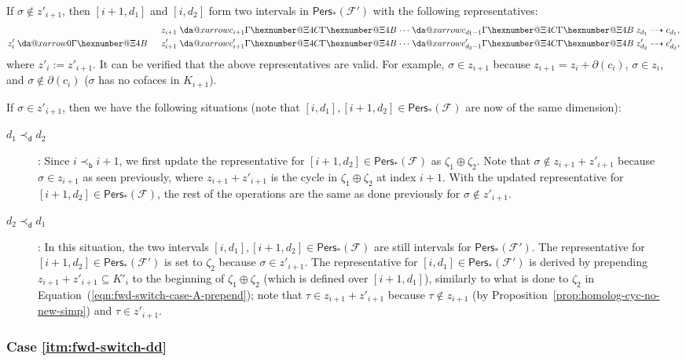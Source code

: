 \documentclass[letterpaper,11pt]{article}
\makeatletter
\theoremstyle{mythmstyle}
\theoremstyle{mydefstyle}
\theoremstyle{plain}
\theoremstyle{definition}
\newcommand{\Pers}{\mathsf{Pers}}
\newcommand{\<}[1]{\langle #1\rangle}
\newcommand{\Fcal}{\mathcal{F}}
\newcommand{\sG}{\sigma}
\newcommand{\tG}{\tau}
\newcommand{\bles}{\prec_{\mathsf{b}}}
\newcommand{\dles}{\prec_{\mathsf{d}}}
\newcommand{\repsum}{\oplus}
\newcommand{\cyc}{z}
\newcommand{\chn}{c}
\newcommand{\rseq}{\zeta}
\newcommand*{\da@rightarrow}{\mathchar"0\hexnumber@\symAMSa 4B }
\newcommand*{\da@leftarrow}{\mathchar"0\hexnumber@\symAMSa 4C }
\newcommand*{\xdashrightarrow}[2][]{%
  \mathrel{%
    \mathpalette{\da@xarrow{#1}{#2}{}\da@rightarrow{\;}{}}{}%
  }%
}
\newcommand{\xdashleftrightarrow}[2][]{%
  \mathrel{%
    \mathpalette{\da@xarrow{#1}{#2}\da@leftarrow\da@rightarrow{}{}}{}%
  }%
}
\newcommand*{\da@xarrow}[7]{%
  \sbox0{$\ifx#7\scriptstyle\scriptscriptstyle\else\scriptstyle\fi#5#1#6\m@th$}%
  \sbox2{$\ifx#7\scriptstyle\scriptscriptstyle\else\scriptstyle\fi#5#2#6\m@th$}%
  \sbox4{$#7\dabar@\m@th$}%
  \dimen@=\wd0 %
  \ifdim\wd2 >\dimen@
    \dimen@=\wd2 %
  \fi
  \count@=2 %
  \def\da@bars{\dabar@\dabar@}%
  \@whiledim\count@\wd4<\dimen@\do{%
    \advance\count@\@ne
    \expandafter\def\expandafter\da@bars\expandafter{%
      \da@bars
      \dabar@ 
    }%
  }%
  \mathrel{#3}%
  \mathrel{%
    \mathop{\da@bars}\limits
    \ifx\\#1\\%
    \else
      _{\copy0}%
    \fi
    \ifx\\#2\\%
    \else
      ^{\copy2}%
    \fi
  }%
  \mathrel{#4}%
  \!\!
}
\let\rseqlrarr\xdashleftrightarrow
\let\rseqrarr\xdashrightarrow
\makeatother
\begin{document}
If $\sG\not\in\cyc'_{i+1}$, 
then $[i+1,d_1]$ and $[i,d_2]$ form two intervals in $\Pers_*(\Fcal')$
with the following representatives:
\begin{alignat}{2}
&&\;&\cyc_{i+1}\rseqlrarr{\chn_{i+1}}\cdots
\rseqlrarr{\chn_{d_1-1}}\cyc_{d_1}\dashrightarrow\chn_{d_1},\\ 
\label{eqn:fwd-switch-case-A-prepend}
&\cyc'_{i}\rseqrarr{0}&&\cyc'_{i+1}\rseqlrarr{\chn'_{i+1}}\cdots
\rseqlrarr{\chn'_{d_2-1}}\cyc'_{d_2}\dashrightarrow\chn'_{d_2},
\end{alignat}
where $\cyc'_{i}:=\cyc'_{i+1}$.
It can be verified that the above representatives are valid.
For example, $\sG\in\cyc_{i+1}$ because $\cyc_{i+1}=\cyc_{i}+\partial(\chn_{i})$,
$\sG\in\cyc_{i}$, and $\sG\not\in\partial(\chn_{i})$ 
($\sG$ has no cofaces in $K_{i+1}$).

If $\sG\in\cyc'_{i+1}$, then we have the following situations
(note that $[i,d_1],[i+1,d_2]\in\Pers_*(\Fcal)$
are now of the same dimension):
\begin{description}
    \item[$d_1\dles d_2$]: Since $i\bles i+1$,
    we first update the representative
    for $[i+1,d_2]\in\Pers_*(\Fcal)$ as $\rseq_1\repsum\rseq_2$. 
    Note that $\sG\not\in\cyc_{i+1}+\cyc'_{i+1}$
    because $\sG\in\cyc_{i+1}$ as seen previously,
    where $\cyc_{i+1}+\cyc'_{i+1}$ is the cycle in $\rseq_1\repsum\rseq_2$
    at index $i+1$.
    With the updated representative
    for $[i+1,d_2]\in\Pers_*(\Fcal)$, 
    the rest of the operations are the same as done previously
    for $\sG\not\in\cyc'_{i+1}$.
    
    \item[$d_2\dles d_1$]:
    In this situation, the two intervals
    $[i,d_1],[i+1,d_2]\in\Pers_*(\Fcal)$
    are still intervals for $\Pers_*(\Fcal')$.
    The representative for $[i+1,d_2]\in\Pers_*(\Fcal')$
    is set to $\rseq_2$ because $\sG\in\cyc'_{i+1}$.
    The representative for $[i,d_1]\in\Pers_*(\Fcal')$
    is derived by prepending $\cyc_{i+1}+\cyc'_{i+1}\subseteq K'_i$ to 
    the beginning of
    $\rseq_1\repsum\rseq_2$ (which is defined over $[i+1,d_1]$),
    similarly to what is done to $\rseq_2$ in Equation~(\ref{eqn:fwd-switch-case-A-prepend});
    note that $\tG\in\cyc_{i+1}+\cyc'_{i+1}$ because
    $\tG\not\in\cyc_{i+1}$ (by Proposition~\ref{prop:homolog-cyc-no-new-simp})
    and $\tG\in\cyc'_{i+1}$.
\end{description}

\subsubsection{Case \ref{itm:fwd-switch-dd}}
\end{document}
